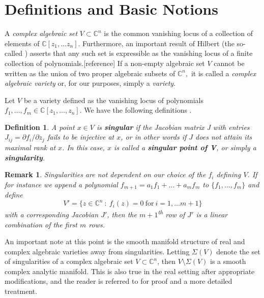\documentclass{article}
\newtheorem{remark}{Remark}[section]
\newtheorem{definition}{Definition}[section]
\begin{document}
\section{Definitions and Basic Notions}

A \textit{complex algebraic set} $V \subset \mathbb{C}^n$ is the common vanishing locus of a collection of elements of $\mathbb{C}[z_1, \dots z_n].$ Furthermore, an important result of Hilbert (the so-called ) asserts that any such set is expressible as the vanishing locus of a finite collection of polynomials.[reference] If a non-empty algebraic set $V$ cannot be written as the union of two proper algebraic subsets of $\mathbb{C}^n,$ it is called a \textit{complex algebraic variety} or, for our purposes, simply a \textit{variety}. 

Let $V$ be a variety defined as the vanishing locus of polynomials $f_1, \dots, f_m \in \mathbb{C}[z_1, \dots, z_n]$. We have the following definitions \cite{milnor_1968}.

\begin{definition}

A point $x \in V$ is \textbf{singular} if the Jacobian matrix J with entries $J_{ij} = \partial f_i/\partial z_j$ fails to be injective at $x$, or in other words if $J$ does not attain its maximal rank at $x$. In this case, $x$ is called a \textbf{singular point of V}, or simply a \textbf{singularity}.

\end{definition}
\begin{remark}
Singularities are not dependent on our choice of the $f_i$ defining $V$. If for instance we append a polynomial $f_{m+1} = a_1f_1 + \dots + a_mf_m$ to $\{f_1, \dots, f_m\}$ and define $$V' = \{z \in \mathbb{C}^n\ :\ f_i(z) = 0 \mathrm{\ for\ }i= 1, \dots m+1\}$$ with a corresponding Jacobian $J'$, then the $m+1$\textsuperscript{th} row of $J'$ is a linear combination of the first $m$ rows.
\end{remark}

An important note at this point is the smooth manifold structure of real and complex algebraic varieties away from singularities. Letting $\Sigma(V)$ denote the set of singularities of a complex algebraic set $V \subset \mathbb{C}^n$, then $V \setminus \Sigma(V)$ is a smooth complex analytic manifold. This is also true in the real setting after appropriate modifications, and the reader is referred to \cite{whitney_1957} for proof and a more detailed treatment.
\end{document}

